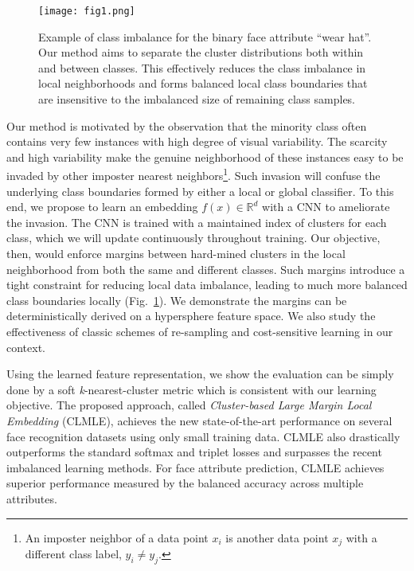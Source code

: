 \documentclass[10pt,journal,compsoc]{IEEEtran}
\begin{document}
\begin{figure}[t]
\begin{center}
\texttt{[image: fig1.png]}
\end{center}
\vspace{-1.5em}
\caption{Example of class imbalance for the binary face attribute ``wear hat''. Our method aims to separate the cluster distributions both within and between classes. This effectively reduces the class imbalance in local neighborhoods and forms balanced local class boundaries that are insensitive to the imbalanced size of remaining class samples.}
\label{fig1}
\end{figure}

Our method is motivated by the observation that the minority class often contains very few instances with high degree of visual variability. The scarcity and high variability make the genuine neighborhood of these instances easy to be invaded by other imposter nearest neighbors\footnote{An imposter neighbor of a data point $x_i$ is another data point $x_j$ with a different class label, $y_i \neq y_j$.}. Such invasion will confuse the underlying class boundaries formed by either a local or global classifier. To this end, we propose to learn an embedding $f(x) \in \mathbb{R}^d$ with a CNN to ameliorate the invasion. The CNN is trained with a maintained index of clusters for each class, which we will update continuously throughout training. Our objective, then, would enforce margins between hard-mined clusters in the local neighborhood from both the same and different classes. Such margins introduce a tight constraint for reducing local data imbalance, leading to much more balanced class boundaries locally (Fig.~\ref{fig1}). We demonstrate the margins can be deterministically derived on a hypersphere feature space. We also study the effectiveness of classic schemes of re-sampling and cost-sensitive learning in our context.

Using the learned feature representation, we show the evaluation can be simply done by a soft \textit{k}-nearest-cluster metric which is consistent with our learning objective. The proposed approach, called \textit{Cluster-based Large Margin Local Embedding} (CLMLE), achieves the new state-of-the-art performance on several face recognition datasets using only small training data. CLMLE also drastically outperforms the standard softmax and triplet losses and surpasses the recent imbalanced learning methods. For face attribute prediction, CLMLE achieves superior performance measured by the balanced accuracy across multiple attributes.
\end{document}

